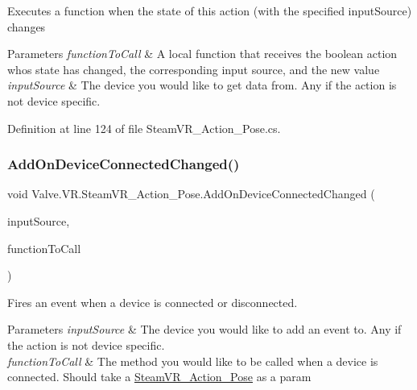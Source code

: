 Executes a function when the state of this action (with the specified input\+Source) changes 


\begin{DoxyParams}{Parameters}
{\em function\+To\+Call} & A local function that receives the boolean action who\textquotesingle{}s state has changed, the corresponding input source, and the new value\\
\hline
{\em input\+Source} & The device you would like to get data from. Any if the action is not device specific.\\
\hline
\end{DoxyParams}


Definition at line 124 of file Steam\+V\+R\+\_\+\+Action\+\_\+\+Pose.\+cs.

\mbox{\label{class_valve_1_1_v_r_1_1_steam_v_r___action___pose_a402f4eeaffab4e2da4c6c1c07df93da5}} 
\subsubsection{\texorpdfstring{AddOnDeviceConnectedChanged()}{AddOnDeviceConnectedChanged()}}
{\footnotesize\ttfamily void Valve.\+V\+R.\+Steam\+V\+R\+\_\+\+Action\+\_\+\+Pose.\+Add\+On\+Device\+Connected\+Changed (\begin{DoxyParamCaption}\item[{\mbox{\hyperlink{namespace_valve_1_1_v_r_a82e5bf501cc3aa155444ee3f0662853f}{Steam\+V\+R\+\_\+\+Input\+\_\+\+Sources}}}]{input\+Source,  }\item[{\mbox{\hyperlink{class_valve_1_1_v_r_1_1_steam_v_r___action___pose_a40c6d9862680e8c99781b3a109d94b82}{Device\+Connected\+Change\+Handler}}}]{function\+To\+Call }\end{DoxyParamCaption})}



Fires an event when a device is connected or disconnected. 


\begin{DoxyParams}{Parameters}
{\em input\+Source} & The device you would like to add an event to. Any if the action is not device specific.\\
\hline
{\em function\+To\+Call} & The method you would like to be called when a device is connected. Should take a \mbox{\hyperlink{class_valve_1_1_v_r_1_1_steam_v_r___action___pose}{Steam\+V\+R\+\_\+\+Action\+\_\+\+Pose}} as a param\\
\hline
\end{DoxyParams}


